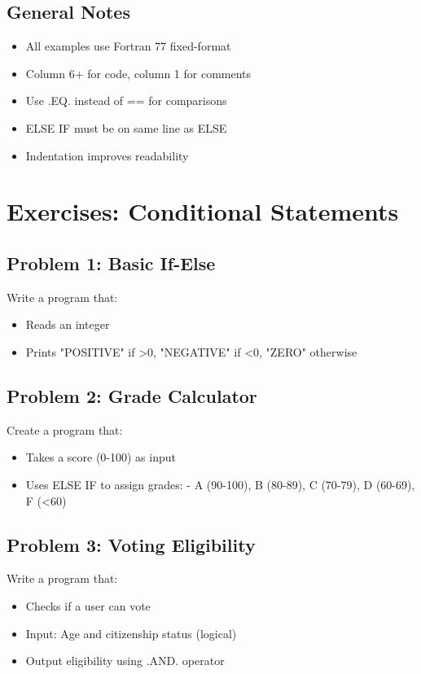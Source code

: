 \documentclass{book}
\begin{document}
\subsection*{General Notes}
\begin{itemize}
\item All examples use Fortran 77 fixed-format
\item Column 6+ for code, column 1 for comments
\item Use .EQ. instead of == for comparisons
\item ELSE IF must be on same line as ELSE
\item Indentation improves readability
\end{itemize}

\section{Exercises: Conditional Statements}

\subsection*{Problem 1: Basic If-Else}  
Write a program that:  
\begin{itemize}  
\item Reads an integer  
\item Prints "POSITIVE" if >0, "NEGATIVE" if <0, "ZERO" otherwise  
\end{itemize}

\subsection*{Problem 2: Grade Calculator}  
Create a program that:  
\begin{itemize}  
\item Takes a score (0-100) as input  
\item Uses ELSE IF to assign grades:  
  - A (90-100), B (80-89), C (70-79), D (60-69), F (<60)  
\end{itemize}

\subsection*{Problem 3: Voting Eligibility}  
Write a program that:  
\begin{itemize}  
\item Checks if a user can vote  
\item Input: Age and citizenship status (logical)  
\item Output eligibility using .AND. operator  
\end{itemize}
\end{document}
